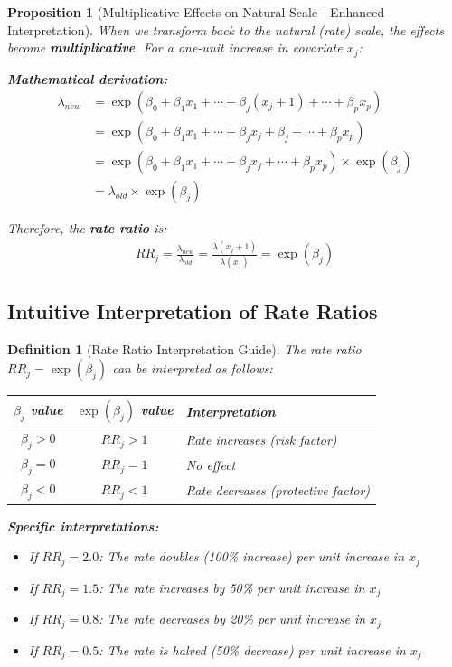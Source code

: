 \documentclass{article}
\newtheorem{definition}{Definition}
\newtheorem{proposition}{Proposition}
\begin{document}
\begin{proposition}[Multiplicative Effects on Natural Scale - Enhanced Interpretation]
When we transform back to the natural (rate) scale, the effects become \textbf{multiplicative}. For a one-unit increase in covariate $x_j$:

\textbf{Mathematical derivation:}
\begin{align}
\lambda_{new} &= \exp(\beta_0 + \beta_1 x_1 + \cdots + \beta_j(x_j + 1) + \cdots + \beta_p x_p) \nonumber\\
&= \exp(\beta_0 + \beta_1 x_1 + \cdots + \beta_j x_j + \beta_j + \cdots + \beta_p x_p) \nonumber\\
&= \exp(\beta_0 + \beta_1 x_1 + \cdots + \beta_j x_j + \cdots + \beta_p x_p) \times \exp(\beta_j) \nonumber\\
&= \lambda_{old} \times \exp(\beta_j) \label{eq:multiplicative_effect}
\end{align}

Therefore, the \textbf{rate ratio} is:
\begin{align}
RR_j = \frac{\lambda_{new}}{\lambda_{old}} = \frac{\lambda(x_j + 1)}{\lambda(x_j)} = \exp(\beta_j) \label{eq:rate_ratio}
\end{align}
\end{proposition}

\subsection{Intuitive Interpretation of Rate Ratios}

\begin{definition}[Rate Ratio Interpretation Guide]
The rate ratio $RR_j = \exp(\beta_j)$ can be interpreted as follows:

\begin{center}
\begin{tabular}{|c|c|l|}
\hline
\textbf{$\beta_j$ value} & \textbf{$\exp(\beta_j)$ value} & \textbf{Interpretation} \\
\hline
$\beta_j > 0$ & $RR_j > 1$ & Rate increases (risk factor) \\
$\beta_j = 0$ & $RR_j = 1$ & No effect \\
$\beta_j < 0$ & $RR_j < 1$ & Rate decreases (protective factor) \\
\hline
\end{tabular}
\end{center}

\textbf{Specific interpretations:}
\begin{itemize}
    \item If $RR_j = 2.0$: The rate doubles (100\% increase) per unit increase in $x_j$
    \item If $RR_j = 1.5$: The rate increases by 50\% per unit increase in $x_j$
    \item If $RR_j = 0.8$: The rate decreases by 20\% per unit increase in $x_j$
    \item If $RR_j = 0.5$: The rate is halved (50\% decrease) per unit increase in $x_j$
\end{itemize}
\end{definition}
\end{document}
